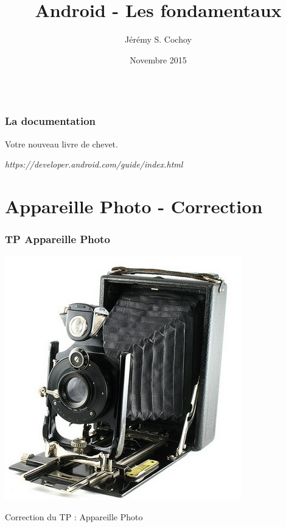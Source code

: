 \documentclass{beamer}
\begin{document}
\title{Android - Les fondamentaux}
\author{Jérémy S. Cochoy}
\date{Novembre 2015}


\begin{frame}
\titlepage
\end{frame}

\begin{frame}
  \begin{columns}[t]
  \begin{column}{5cm}
  \tableofcontents[sections={1-3}]
  \end{column}
  \begin{column}{5cm}
  \tableofcontents[sections={4-8}]
  \end{column}
  \end{columns}
\end{frame}

\begin{frame}
\frametitle{La documentation}

\begin{block}{Votre nouveau livre de chevet.}
\begin{center}
\emph{https://developer.android.com/guide/index.html}
\end{center}
\end{block}

\end{frame}

\section{Appareille Photo - Correction}

\begin{frame}
\frametitle{TP Appareille Photo}
\begin{center}
\includegraphics[scale=0.4]{appareil-photo-vintage.jpg}
\end{center}
\begin{block}{}
\begin{center}
Correction du TP : Appareille Photo
\end{center}
\end{block}
\end{frame}
\end{document}
